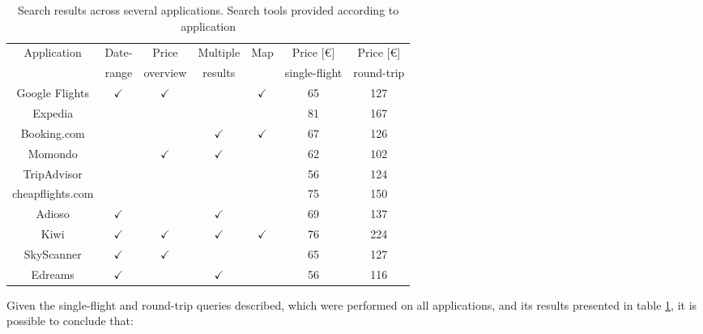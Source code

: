 \begin{table}[]
  \centering
  \caption{Search results across several applications. Search tools provided according to application}
  \label{tab:single_round_flights}
  \begin{tabular}{c|c|c|c|c|c|c}
  \hline
\multirow{2}{*}{Application} & Date- & Price & Multiple &  \multirow{2}{*}{Map}   & Price [€]    & Price [€]    \\ 
 & range         & overview      & results       &       & single-flight    & round-trip      \\ \hline
  Google Flights      & $\checkmark$ &  $\checkmark$ &            & $\checkmark$ & 65       & 127 \\ \hline
  Expedia             &   &            &            & & 81 & 167\\ \hline
  Booking.com        & & & $\checkmark$ & $\checkmark$ & 67 & 126 \\ \hline
  Momondo             & & $\checkmark$ & $\checkmark$ & & 62   & \cellcolor[HTML]{C0C0C0}102 \\ \hline
  TripAdvisor         &  & & &  & \cellcolor[HTML]{C0C0C0}56 & 124 \\ \hline
  cheapflights.com    & & & & & 75 & 150 \\ \hline
  Adioso              & $\checkmark$ & & $\checkmark$ & & 69 & 137 \\ \hline
  Kiwi                & $\checkmark$ & $\checkmark$ & $\checkmark$ & $\checkmark$ & 76 & 224 \\ \hline
  SkyScanner          & $\checkmark$ & $\checkmark$ &  & & 65 & 127 \\ \hline
  Edreams             & $\checkmark$ & & $\checkmark$ & & \cellcolor[HTML]{C0C0C0}56 & 116 \\ \hline
  \end{tabular}
\end{table}
  
Given the single-flight and round-trip queries described, which were performed on all applications, and its results presented in table \ref{tab:single_round_flights}, it is possible to conclude that: 

